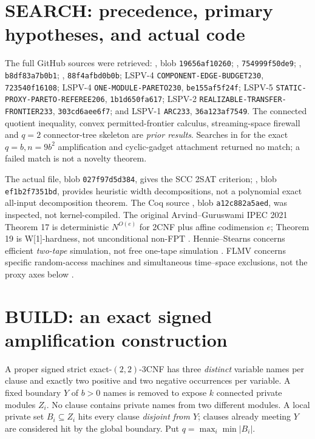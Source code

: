 \documentclass[10.5pt]{article}
\begin{document}
\section{SEARCH: precedence, primary hypotheses, and actual code}
The full GitHub sources were retrieved: , blob \texttt{19656af10260}; , \texttt{754999f50de9}; , \texttt{b8df83a7b0b1}; , \texttt{88f4afbd0b0b}; LSPV-4 \texttt{COMPONENT-EDGE-BUDGET230}, \texttt{723540f16108}; LSPV-4 \texttt{ONE-MODULE-PARETO230}, \texttt{be155af5f24f}; LSPV-5 \texttt{STATIC-PROXY-PARETO-REFEREE206}, \texttt{1b1d650fa617}; LSPV-2 \texttt{REALIZABLE-TRANSFER-FRONTIER233}, \texttt{303cd6aee6f7}; and LSPV-1 \texttt{ARC233}, \texttt{36a123af7549}. The connected quotient inequality, convex permitted-frontier calculus, streaming-space firewall and $q=2$ connector-tree skeleton are \emph{prior results}. Searches in  for the exact $q=b,n=9b^2$ amplification and cyclic-gadget attachment returned no match; a failed match is not a novelty theorem.

The actual  file, blob \texttt{027f97d5d384}, gives the SCC 2SAT criterion; , blob \texttt{ef1b2f7351bd}, provides heuristic width decompositions, not a polynomial exact all-input decomposition theorem. The Coq source , blob \texttt{a12c882a5aed}, was inspected, not kernel-compiled. The original Arvind--Guruswami IPEC 2021 Theorem 17 is deterministic $N^{O(e)}$ for 2CNF plus affine codimension $e$; Theorem 19 is W[1]-hardness, not unconditional non-FPT \cite{ag}. Hennie--Stearns concerns efficient \emph{two-tape} simulation, not free one-tape simulation \cite{hs}. FLMV concerns specific random-access machines and simultaneous time--space exclusions, not the proxy axes below \cite{flmv}.

\section{BUILD: an exact signed amplification construction}
A proper signed strict exact-$(2,2)$-3CNF has three \emph{distinct} variable names per clause and exactly two positive and two negative occurrences per variable. A fixed boundary $Y$ of $b>0$ names is removed to expose $k$ connected private modules $Z_i$. No clause contains private names from two different modules. A local private set $B_i\subseteq Z_i$ hits every clause \emph{disjoint from $Y$}; clauses already meeting $Y$ are considered hit by the global boundary. Put $q=\max_i\min |B_i|$.
\end{document}
